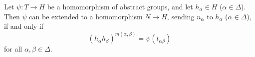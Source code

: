 Let $\psi: T \rightarrow H$ be a homomorphism of abstract groups, and let $h_\alpha \in H$ ($\alpha \in \Delta$). Then $\psi$ can be extended to a homomorphism $N \rightarrow H$, sending $n_\alpha$ to $h_\alpha$ ($\alpha \in \Delta$), if and only if
$$(h_\alpha h_\beta)^{m(\alpha, \beta)} = \psi(t_{\alpha\beta})$$
for all $\alpha, \beta \in \Delta$.
